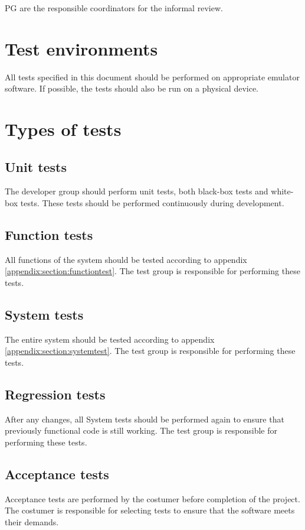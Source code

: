 \documentclass[a4paper]{article}
\begin{document}
PG are the responsible coordinators for the informal review.

\section{Test environments}
All tests specified in this document should be performed on appropriate emulator software. If possible, the tests should also be run on a physical device.

\section{Types of tests}

\subsection{Unit tests}
The developer group should perform unit tests, both black-box tests and white-box tests. These tests should be performed continuously during development.

\subsection{Function tests}
All functions of the system should be tested according to appendix \ref{appendix:section:functiontest}. The test group is responsible for  performing these tests.

\subsection{System tests}
The entire system should be tested according to appendix \ref{appendix:section:systemtest}. The test group is responsible for performing these tests. 

\subsection{Regression tests}
After any changes, all System tests should be performed again to ensure that previously functional code is still working. The test group is responsible for performing these tests.

\subsection{Acceptance tests}
Acceptance tests are performed by the costumer before completion of the project. The costumer is responsible for selecting tests to ensure that the software meets their demands.
\end{document}
